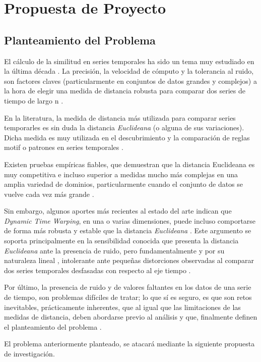 \section{\textbf{Propuesta de Proyecto}}
\subsection{Planteamiento del Problema}
El c\'alculo de la similitud en series temporales ha sido un tema muy estudiado en la \'ultima d\'ecada \cite{rulediscovery}. La precisi\'on, la velocidad de c\'omputo y la tolerancia al ruido, son factores claves (particularmente en conjuntos de datos grandes y complejos) a la hora de elegir una medida de distancia robusta para comparar dos series de tiempo de largo n \cite{multidimensional}.\par
En la literatura, la medida de distancia m\'as utilizada para comparar series temporarles es sin duda la distancia \textit{Euclideana} (o alguna de sus variaciones). Dicha medida es muy utilizada en el descubrimiento y la comparaci\'on de reglas motif o patrones en series temporales \cite{motifs}\cite{patterns}.\par
Existen pruebas emp\'iricas fiables, que demuestran que la distancia Euclideana es muy competitiva e incluso superior a medidas mucho m\'as complejas en una amplia variedad de dominios, particularmente cuando el conjunto de datos se vuelve cada vez m\'as grande \cite{distancecomparison}\cite{timewarpingindexing}.\par
Sin embargo, algunos aportes m\'as recientes al estado del arte indican que  \textit{Dynamic Time Warping}, en una o varias dimensiones, puede incluso comportarse de forma m\'as robusta y estable que la distancia \textit{Euclideana} \cite{keogh}. Este argumento se soporta principalmente en la sensibilidad conocida que presenta la distancia \textit{Euclideana} ante la presencia de ruido, pero fundamentalmente y por su naturaleza lineal \cite{euclidean}, intolerante ante peque\~nas distorciones observadas al comparar dos series temporales desfasadas con respecto al eje tiempo \cite{DTWcubicsplineinterpolation}.\par
Por \'ultimo, la presencia de ruido y de valores faltantes en los datos de una serie de tiempo, son problemas dif\'iciles de tratar; lo que s\'i es seguro, es que son retos inevitables, pr\'acticamente inherentes, que al igual que las limitaciones de las medidas de distancia, deben abordarse previo al an\'alisis y que, finalmente definen el planteamiento del problema \cite{noise}.\par
El problema anteriormente planteado, se atacar\'a mediante la siguiente propuesta de investigaci\'on.
